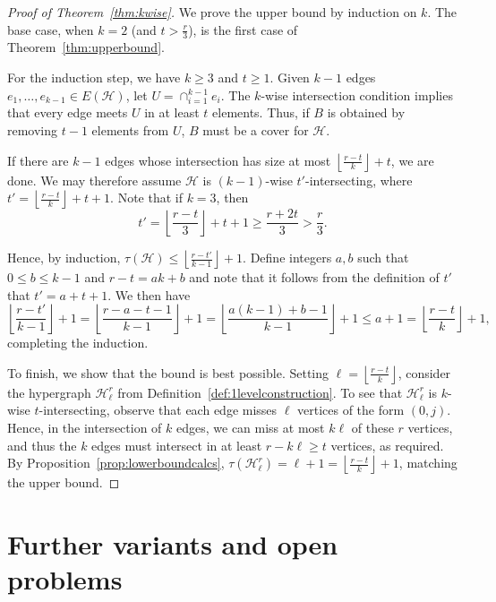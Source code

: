 \documentclass[a4paper,twoside,11pt]{article}
\numberwithin{thm}{section}
\theoremstyle{definition}
\theoremstyle{remark}
\theoremstyle{definition}
\newcommand{\m}[1]{\mathcal{#1}}
\begin{document}
\begin{proof}[Proof of Theorem~\ref{thm:kwise}]
We prove the upper bound by induction on $k$.  The base case, when $k = 2$ (and $t > \tfrac{r}{3}$), is the first case of Theorem~\ref{thm:upperbound}.

For the induction step, we have $k \ge 3$ and $t \ge 1$.  Given $k-1$ edges $e_1, \hdots, e_{k-1} \in E(\m H)$, let $U = \cap_{i=1}^{k-1} e_i$.  The $k$-wise intersection condition implies that every edge meets $U$ in at least $t$ elements.  Thus, if $B$ is obtained by removing $t-1$ elements from $U$, $B$ must be a cover for $\m H$.

If there are $k-1$ edges whose intersection has size at most $\left\lfloor \frac{r-t}{k} \right \rfloor + t$, we are done.  We may therefore assume $\m H$ is $(k-1)$-wise $t'$-intersecting, where $t' = \left\lfloor \frac{r-t}{k} \right\rfloor + t + 1$.  Note that if $k = 3$, then
\[ t' = \left\lfloor \frac{r-t}{3} \right\rfloor + t + 1 \ge \frac{r+2t}{3} > \frac{r}{3}. \]

Hence, by induction, $\tau(\m H) \le \left \lfloor \frac{r-t'}{k-1} \right \rfloor + 1$.  Define integers $a,b$ such that $0 \le b \le k-1$ and  $r - t = ak + b$ and note that it follows from the definition of $t'$ that  $t' = a + t + 1$.  We then have
\[ \left \lfloor \frac{r-t'}{k-1} \right\rfloor + 1 = \left \lfloor \frac{ r - a - t - 1 }{k-1} \right \rfloor + 1 = \left\lfloor \frac{a(k-1) + b - 1}{k-1} \right\rfloor + 1 \le a + 1 = \left\lfloor \frac{r-t}{k} \right\rfloor + 1, \]
completing the induction.

To finish, we show that the bound is best possible.  Setting $\ell = \left\lfloor \frac{r-t}{k} \right\rfloor$, consider the hypergraph $\m H_{\ell}^r$ from Definition~\ref{def:1levelconstruction}.  To see that $\m H_{\ell}^r$ is $k$-wise $t$-intersecting, observe that each edge misses $\ell$ vertices of the form $(0,j)$.  Hence, in the intersection of $k$ edges, we can miss at most $k \ell$ of these $r$ vertices, and thus the $k$ edges must intersect in at least $r - k \ell \ge t$ vertices, as required.  By Proposition~\ref{prop:lowerboundcalcs}, $\tau(\m H_{\ell}^r) = \ell + 1 = \left\lfloor \frac{r-t}{k} \right\rfloor + 1$, matching the upper bound.
\end{proof}

\section{Further variants and open problems} \label{sec:variants}
\end{document}
